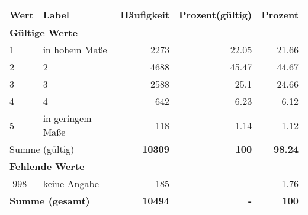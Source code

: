      \begin{longtable}{lXrrr}
     \toprule
     \textbf{Wert} & \textbf{Label} & \textbf{Häufigkeit} & \textbf{Prozent(gültig)} & \textbf{Prozent} \\
     \endhead
     \midrule
     \multicolumn{5}{l}{\textbf{Gültige Werte}}\\

     1 &
     \multicolumn{1}{X}{ in hohem Maße   } &


       \num{2273} &
       \num[round-mode=places,round-precision=2]{22.05} &
         \num[round-mode=places,round-precision=2]{21.66} \\

     2 &
     \multicolumn{1}{X}{ 2   } &


       \num{4688} &
       \num[round-mode=places,round-precision=2]{45.47} &
         \num[round-mode=places,round-precision=2]{44.67} \\

     3 &
     \multicolumn{1}{X}{ 3   } &


       \num{2588} &
       \num[round-mode=places,round-precision=2]{25.1} &
         \num[round-mode=places,round-precision=2]{24.66} \\

     4 &
     \multicolumn{1}{X}{ 4   } &


       \num{642} &
       \num[round-mode=places,round-precision=2]{6.23} &
         \num[round-mode=places,round-precision=2]{6.12} \\

     5 &
     \multicolumn{1}{X}{ in geringem Maße   } &


       \num{118} &
       \num[round-mode=places,round-precision=2]{1.14} &
         \num[round-mode=places,round-precision=2]{1.12} \\
     \midrule
     \multicolumn{2}{l}{Summe (gültig)} &
       \textbf{\num{10309}} &
     \textbf{\num{100}} &
       \textbf{\num[round-mode=places,round-precision=2]{98.24}} \\
     \multicolumn{5}{l}{\textbf{Fehlende Werte}}\\
       -998 &
       keine Angabe &
         \num{185} &
        - &
         \num[round-mode=places,round-precision=2]{1.76} \\
     \midrule
     \multicolumn{2}{l}{\textbf{Summe (gesamt)}} &
          \textbf{\num{10494}} &
        \textbf{-} &
        \textbf{\num{100}} \\
     \bottomrule
     \end{longtable}
     
